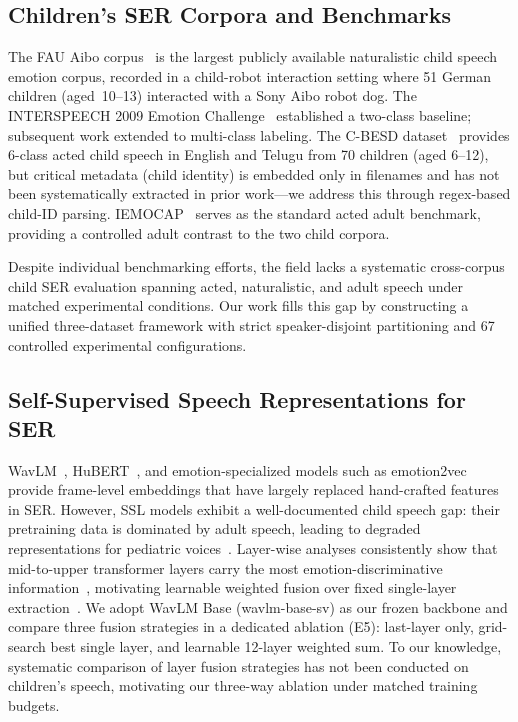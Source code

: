 \documentclass[11pt,a4paper]{article}
\begin{document}
\subsection{Children's SER Corpora and Benchmarks}

The FAU Aibo corpus~\cite{batliner2011fau,steidl2009fau} is the largest
publicly available naturalistic child speech emotion corpus, recorded in a
child-robot interaction setting where 51 German children
(aged~10--13) interacted with a Sony Aibo robot dog. The INTERSPEECH
2009 Emotion Challenge~\cite{schuller2009interspeech} established a two-class
baseline; subsequent work extended to multi-class labeling. The C-BESD
dataset~\cite{sazali2023besd,rao2024cbesd} provides 6-class acted child speech
in English and Telugu from 70 children (aged 6--12), but critical metadata (child identity)
is embedded only in filenames and has not been systematically extracted in prior
work---we address this through regex-based child-ID parsing.
IEMOCAP~\cite{busso2008iemocap} serves as the standard acted adult benchmark,
providing a controlled adult contrast to the two child corpora.

Despite individual benchmarking efforts, the field lacks a systematic
cross-corpus child SER evaluation spanning acted, naturalistic, and adult speech
under matched experimental conditions. Our work fills this gap by constructing a
unified three-dataset framework with strict speaker-disjoint partitioning and 67
controlled experimental configurations.

\subsection{Self-Supervised Speech Representations for SER}

WavLM~\cite{chen2022wavlm}, HuBERT~\cite{hsu2021hubert}, and
emotion-specialized models such as emotion2vec~\cite{ma2024emotion2vec}
provide frame-level embeddings that have largely replaced hand-crafted features
in SER. However, SSL models exhibit a well-documented child speech gap: their
pretraining data is dominated by adult speech, leading to degraded
representations for pediatric voices~\cite{meng2022data,fan2023draft}.
Layer-wise analyses consistently show that mid-to-upper transformer
layers carry the most emotion-discriminative information~\cite{pasad2021layer,
upadhyay2024wavlm,chiu2025probing},
motivating learnable weighted fusion over fixed single-layer
extraction~\cite{rozen2024layer}. We adopt WavLM Base (wavlm-base-sv) as our
frozen backbone and compare three fusion strategies in a dedicated ablation
(E5): last-layer only, grid-search best single layer, and learnable 12-layer
weighted sum. To our knowledge, systematic comparison of layer fusion strategies
has not been conducted on children's speech, motivating our three-way ablation
under matched training budgets.
\end{document}
